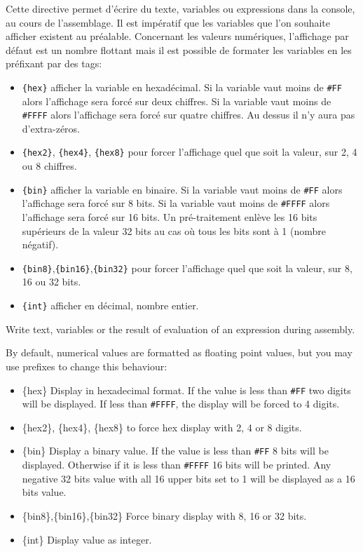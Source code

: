 \begin{xfr}
Cette directive permet d'écrire du texte, variables ou expressions dans la console, au cours de l'assemblage. Il est impératif que les variables que l'on souhaite afficher existent au préalable. Concernant les valeurs numériques, l'affichage par défaut est un nombre flottant mais il est possible de formater les variables en les préfixant par des tags:

\begin{itemize}
\item \texttt{\{hex\}} afficher la variable en hexadécimal. Si la variable vaut moins de \texttt{\#FF} alors l'affichage sera forcé sur deux chiffres. Si la variable vaut moins de \texttt{\#FFFF} alors l'affichage sera forcé sur quatre chiffres. Au dessus il n'y aura pas d'extra-zéros.
\item \texttt{\{hex2\}}, \texttt{\{hex4\}}, \texttt{\{hex8\}}
pour forcer l'affichage quel que soit la valeur, sur 2, 4 ou 8 chiffres.
\item \texttt{\{bin\}} afficher la variable en binaire. Si la variable vaut moins de \texttt{\#FF} alors l'affichage sera forcé sur 8 bits. Si la variable vaut moins de \texttt{\#FFFF} alors l'affichage sera forcé sur 16 bits. Un pré-traitement enlève les 16 bits supérieurs de la valeur 32 bits au cas où tous les bits sont à 1 (nombre négatif).
\item \texttt{\{bin8\}},\texttt{\{bin16\}},\texttt{\{bin32\}} pour forcer l'affichage quel que soit la valeur, sur 8, 16 ou 32 bits.
\item \texttt{\{int\}} afficher en décimal, nombre entier.
\end{itemize}

\end{xfr}


\begin{xen}
Write text, variables or the result of evaluation of an expression during assembly.

By default, numerical values are formatted as floating point values, but you may use prefixes to change this behaviour:
\begin{itemize}
\item \{hex\}
Display in hexadecimal format. If the value is less than \texttt{\#FF} two digits will be displayed. If less than \texttt{\#FFFF}, the display will be forced to 4 digits. %
\item \{hex2\}, \{hex4\}, \{hex8\} to force hex display with 2, 4 or 8 digits.
\item \{bin\} Display a binary value. If the value is less than \texttt{\#FF} 8 bits will be displayed. Otherwise if it is less than \texttt{\#FFFF} 16 bits will be printed. Any negative 32 bits value with all 16 upper bits set to 1 will be displayed as a 16 bits value.
\item \{bin8\},\{bin16\},\{bin32\} Force binary display with 8, 16 or 32 bits.
\item \{int\} Display value as integer.
\end{itemize}
\end{xen}


